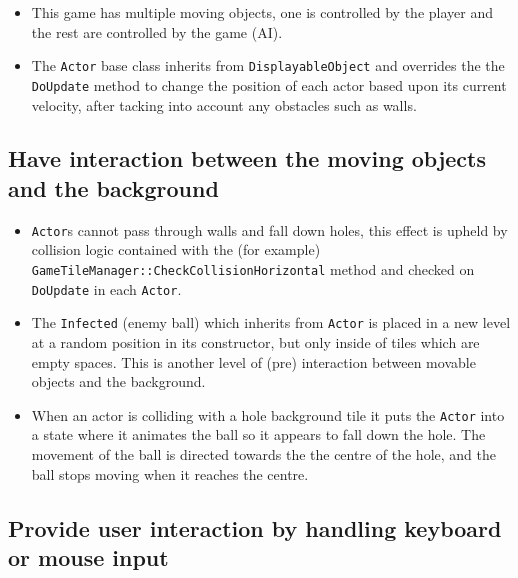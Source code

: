 \begin{itemize}
	\item This game has multiple moving objects, one is controlled by the player and the rest are controlled by the game (AI).
	\item The \verb!Actor! base class inherits from \verb!DisplayableObject! and overrides the the \verb!DoUpdate! method to change the position of each actor based upon its current velocity, after tacking into account any obstacles such as walls.
\end{itemize}

\subsection{Have interaction between the moving objects and the background}

\begin{itemize}
	\item \verb!Actor!s cannot pass through walls and fall down holes, this effect is upheld by collision logic contained with the (for example) \verb!GameTileManager::CheckCollisionHorizontal! method and checked on \verb!DoUpdate! in each \verb!Actor!.
	\item The \verb!Infected! (enemy ball) which inherits from \verb!Actor! is placed in a new level at a random position in its constructor, but only inside of tiles which are empty spaces. This is another level of (pre) interaction between movable objects and the background.
	\item When an actor is colliding with a hole background tile it puts the \verb!Actor! into a state where it animates the ball so it appears to fall down the hole. The movement of the ball is directed towards the the centre of the hole, and the ball stops moving when it reaches the centre.
\end{itemize}

\subsection{Provide user interaction by handling keyboard or mouse input}

